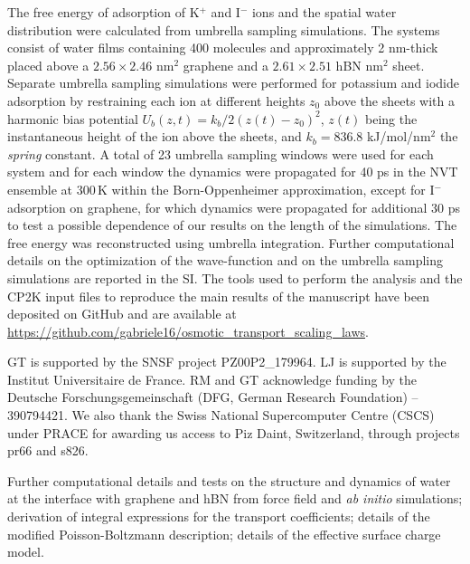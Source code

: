 \documentclass[journal=ancac3,manuscript=article,layout=twocolumn]{achemso}
\begin{document}
The free energy of adsorption of K$^+$ and I$^-$ ions
and the spatial water distribution were calculated from umbrella sampling simulations\cite{torrie1977nonphysical}.
The systems consist of water films containing 400 molecules and approximately 2 nm-thick
placed above a $2.56 \times 2.46$ nm$^2$ graphene and a $2.61 \times 2.51$ hBN nm$^2$ sheet.
Separate umbrella sampling simulations were performed for potassium and iodide
adsorption by restraining each ion at different heights  $z_0$ above the sheets with
a harmonic bias potential $U_b(z,t) = k_b/2 (z(t)-z_0)^2$,  $z(t)$ being the
instantaneous height of the ion above the sheets,
and $k_b = 836.8$ kJ/mol/nm$^2$ the \textit{spring} constant.
A total of 23 umbrella sampling windows were used for each system
and for each window the dynamics were propagated for 40 ps
in the NVT ensemble at 300\,K within the Born-Oppenheimer
approximation, except for I$^{-}$ adsorption on graphene,
for which  dynamics were propagated for additional 30 ps to test
a possible dependence of our results on the length of the
simulations. The free energy was reconstructed using umbrella integration\cite{kastner2011umbrella}.
Further computational details on the  optimization
of the wave-function and on the umbrella sampling
simulations are reported in the SI.
The tools used to perform the analysis and the CP2K input files
to reproduce the main results of the manuscript have been deposited on
GitHub and are available at \url{https://github.com/gabriele16/osmotic_transport_scaling_laws}.


 \begin{acknowledgement}
 GT is supported by the SNSF project PZ00P2\_179964.
 LJ is supported by %
the Institut Universitaire de France.
RM and GT acknowledge funding by the Deutsche Forschungsgemeinschaft (DFG, German Research Foundation) -- 390794421.
 We also thank the Swiss National Supercomputer Centre (CSCS) under PRACE for awarding us access to
 Piz Daint, Switzerland, through projects pr66 and s826.

 \end{acknowledgement}

\begin{suppinfo}
Further computational details and tests
on the structure and dynamics
of water at the interface with
graphene and hBN  from
force field and \textit{ab initio} simulations;
derivation of integral expressions for the transport coefficients;
details of the modified Poisson-Boltzmann description;
details of the effective surface charge model.
\end{suppinfo}

%

\end{document}
